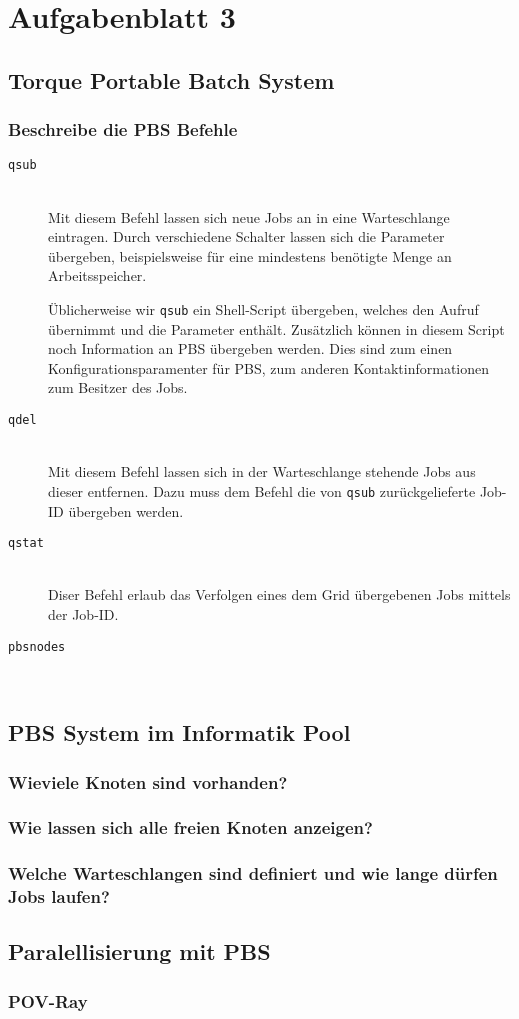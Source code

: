 \section{Aufgabenblatt 3}

\subsection{Torque Portable Batch System}
\subsubsection{Beschreibe die PBS Befehle}

\begin{description}
	\item[\texttt{qsub}] \hfill \\
		Mit diesem Befehl lassen sich neue Jobs an in eine Warteschlange eintragen.
		Durch verschiedene Schalter lassen sich die Parameter \"ubergeben,
		beispielsweise für eine mindestens benötigte Menge an Arbeitsspeicher.

		Üblicherweise wir \texttt{qsub} ein Shell-Script übergeben,
		welches den Aufruf übernimmt und die Parameter enthält.
		Zusätzlich können in diesem Script noch Information an PBS übergeben werden.
		Dies sind zum einen Konfigurationsparamenter für PBS,
		zum anderen Kontaktinformationen zum Besitzer des Jobs.

	\item[\texttt{qdel}] \hfill \\
		Mit diesem Befehl lassen sich in der Warteschlange stehende Jobs aus dieser entfernen.
		Dazu muss dem Befehl die von \texttt{qsub} zurückgelieferte Job-ID übergeben werden.

	\item[\texttt{qstat}] \hfill \\
		Diser Befehl erlaub das Verfolgen eines dem Grid übergebenen Jobs mittels der Job-ID.

	\item[\texttt{pbsnodes}] \hfill \\
\end{description}


\subsection{PBS System im Informatik Pool}
\subsubsection{Wieviele Knoten sind vorhanden?}
\subsubsection{Wie lassen sich alle freien Knoten anzeigen?}
\subsubsection{Welche Warteschlangen sind definiert und wie lange d\"urfen Jobs laufen?}


\subsection{Paralellisierung mit PBS}

\subsubsection{POV-Ray}
